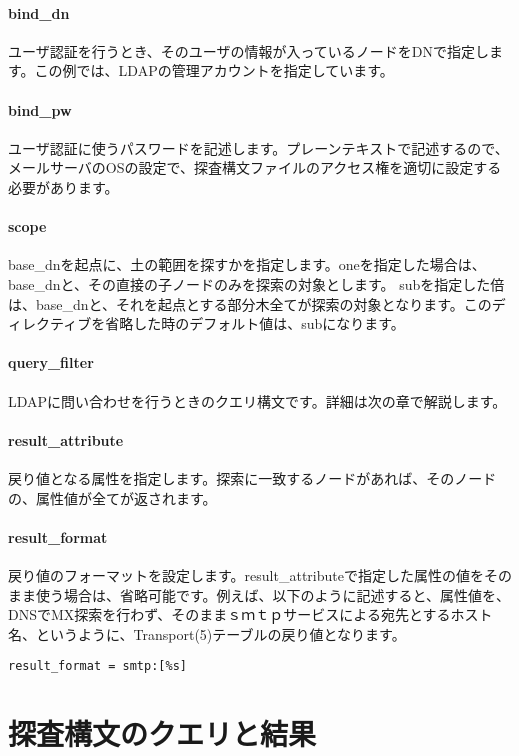 \paragraph{bind\_dn}
ユーザ認証を行うとき、そのユーザの情報が入っているノードをDNで指定します。この例では、LDAPの管理アカウントを指定しています。

\paragraph{bind\_pw}
ユーザ認証に使うパスワードを記述します。プレーンテキストで記述するので、メールサーバのOSの設定で、探査構文ファイルのアクセス権を適切に設定する必要があります。

\paragraph{scope}
base\_dnを起点に、土の範囲を探すかを指定します。oneを指定した場合は、base\_dnと、その直接の子ノードのみを探索の対象とします。
subを指定した倍は、base\_dnと、それを起点とする部分木全てが探索の対象となります。このディレクティブを省略した時のデフォルト値は、subになります。

\paragraph{query\_filter}
LDAPに問い合わせを行うときのクエリ構文です。詳細は次の章で解説します。

\paragraph{result\_attribute}
戻り値となる属性を指定します。探索に一致するノードがあれば、そのノードの、属性値が全てが返されます。

\paragraph{result\_format}
戻り値のフォーマットを設定します。result\_attributeで指定した属性の値をそのまま使う場合は、省略可能です。例えば、以下のように記述すると、属性値を、DNSでMX探索を行わず、そのままｓｍｔｐサービスによる宛先とするホスト名、というように、Transport(5)テーブルの戻り値となります。

\begin{verbatim}
result_format = smtp:[%s]
\end{verbatim}

\section{探査構文のクエリと結果}


